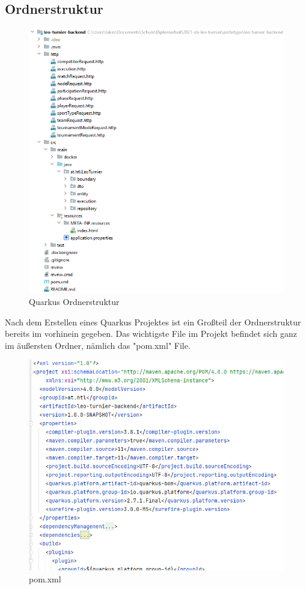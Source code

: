 \subsection{Ordnerstruktur}

\begin{figure}[H]
    \includegraphics[scale=0.8]{pics/backend/quarkus_file_structure.png}
    \caption{Quarkus Ordnerstruktur}
\end{figure}

Nach dem Erstellen eines Quarkus Projektes ist ein Großteil der Ordnerstruktur bereits im vorhinein gegeben. Das wichtigste File im Projekt befindet sich ganz im äußersten Ordner, nämlich das "pom.xml" File. 

\begin{figure}[H]
    \includegraphics[scale=0.6]{pics/backend/pom.xml.png}
    \caption{pom.xml}
\end{figure}

